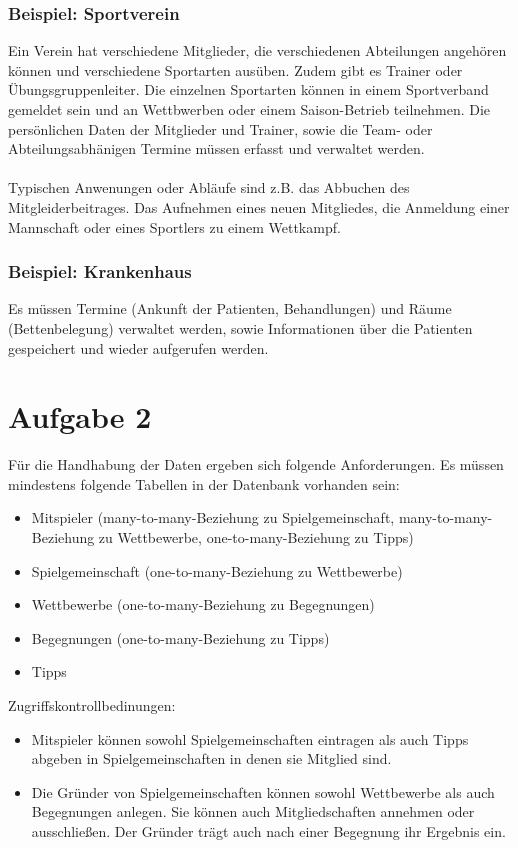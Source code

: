 \documentclass[12pt]{article}
\begin{document}
\subsubsection{Beispiel: Sportverein}
Ein Verein hat verschiedene Mitglieder, die verschiedenen Abteilungen 
angehören können und verschiedene Sportarten ausüben. Zudem gibt es
Trainer oder Übungsgruppenleiter. Die einzelnen Sportarten können in einem Sportverband gemeldet sein und an Wettbwerben oder einem Saison-Betrieb teilnehmen. Die persönlichen Daten der Mitglieder und Trainer, sowie die Team- oder Abteilungsabhänigen Termine müssen erfasst und verwaltet werden.
\\\\
Typischen Anwenungen oder Abläufe sind z.B. das Abbuchen des Mitgleiderbeitrages. Das Aufnehmen eines neuen Mitgliedes,
die Anmeldung einer Mannschaft oder eines Sportlers zu einem Wettkampf.

\subsubsection{Beispiel: Krankenhaus}
Es müssen Termine (Ankunft der Patienten, Behandlungen) und Räume (Bettenbelegung) verwaltet werden, sowie Informationen über die Patienten gespeichert und wieder aufgerufen werden.

\section{Aufgabe 2}
Für die Handhabung der Daten ergeben sich folgende Anforderungen. Es müssen
mindestens folgende Tabellen in der Datenbank vorhanden sein:
\begin{itemize}
	\item Mitspieler (many-to-many-Beziehung zu Spielgemeinschaft, many-to-many-Beziehung zu Wettbewerbe, one-to-many-Beziehung zu Tipps)
	\item Spielgemeinschaft (one-to-many-Beziehung zu Wettbewerbe)
	\item Wettbewerbe (one-to-many-Beziehung zu Begegnungen)
	\item Begegnungen (one-to-many-Beziehung zu Tipps)
	\item Tipps
\end{itemize}

Zugriffskontrollbedinungen:
\begin{itemize}
	\item Mitspieler können sowohl Spielgemeinschaften eintragen als auch Tipps abgeben in Spielgemeinschaften in denen sie Mitglied sind.
	\item Die Gründer von Spielgemeinschaften können sowohl Wettbewerbe als 
	auch Begegnungen anlegen. Sie können auch Mitgliedschaften annehmen
	oder ausschließen. Der Gründer trägt auch nach einer Begegnung ihr Ergebnis
	ein.
\end{itemize}
\end{document}
